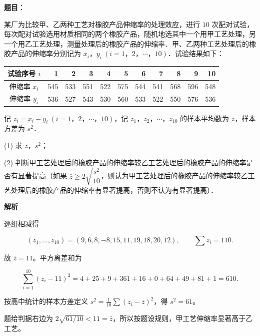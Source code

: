 \begin{answer}

\textbf{题目}：

某厂为比较甲、乙两种工艺对橡胶产品伸缩率的处理效应，进行 $10$ 次配对试验，每次配对试验选用材质相同的两个橡胶产品，随机地选其中一个用甲工艺处理，另一个用乙工艺处理，测量处理后的橡胶产品的伸缩率．甲、乙两种工艺处理后的橡胶产品的伸缩率分别记为 $x_i\text{，}y_i\ (i=1\text{，}2\text{，}\cdots\text{，}10)$．试验结果如下：

\begin{center}
\begingroup\setlength{\tabcolsep}{4pt}
\begin{tabular}{crrrrrrrrrr}
\toprule
试验序号 $i$ & 1 & 2 & 3 & 4 & 5 & 6 & 7 & 8 & 9 & 10 \\
\midrule
伸缩率 $x_i$ & 545 & 533 & 551 & 522 & 575 & 544 & 541 & 568 & 596 & 548 \\
伸缩率 $y_i$ & 536 & 527 & 543 & 530 & 560 & 533 & 522 & 550 & 576 & 536 \\
\bottomrule
\end{tabular}
\endgroup
\end{center}

记 $z_i=x_i-y_i\ (i=1\text{，}2\text{，}\cdots\text{，}10)$，记 $z_1\text{，}z_2\text{，}\cdots\text{，}z_{10}$ 的样本平均数为 $\bar z$，样本方差为 $s^2$．

(1) 求 $\bar z\text{，}s^2$；

(2) 判断甲工艺处理后的橡胶产品的伸缩率较乙工艺处理后的橡胶产品的伸缩率是否有显著提高（如果 $\bar z\geqslant2\sqrt{\dfrac{s^2}{10}}$，则认为甲工艺处理后的橡胶产品的伸缩率较乙工艺处理后的橡胶产品的伸缩率有显著提高，否则不认为有显著提高）．

\textbf{解析}


逐组相减得

\nopagebreak[4]
\[
(z_1,\ldots,z_{10})=(9,6,8,-8,15,11,19,18,20,12),\qquad \sum z_i=110.
\]

故 $\bar z=11$。平方离差和为

\nopagebreak[4]
\[
\sum_{i=1}^{10}(z_i-11)^2=4+25+9+361+16+0+64+49+81+1=610.
\]

按高中统计的样本方差定义 $s^2=\frac1{10}\sum(z_i-\bar z)^2$，得 $s^2=61$。


题给判据右边为 $2\sqrt{61/10}<11=\bar z$，所以按题设规则，甲工艺伸缩率显著高于乙工艺。



\end{answer}
